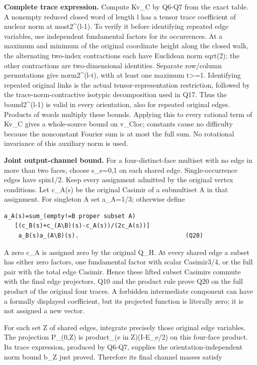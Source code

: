 \documentclass[11pt,a4paper]{article}
\newcounter{none}
\renewcommand{\[}{\begingroup\small\originaldisplaystart}
\renewcommand{\]}{\originaldisplayend\endgroup}
\begin{document}
\textbf{Complete trace expression.} Compute Kv\_C by Q6-Q7 from the
exact table. A nonempty reduced closed word of length l has a tensor
trace coefficient of nuclear norm at most2\^{}(l-1). To verify it before
identifying repeated edge variables, use independent fundamental factors
for its occurrences. At a maximum and minimum of the original coordinate
height along the closed walk, the alternating two-index contractions
each have Euclidean norm sqrt(2); the other contractions are
two-dimensional identities. Separate row/column permutations give
norm2\^{}(l-t), with at least one maximum t\textgreater=1. Identifying
repeated original links is the actual tensor-representation restriction,
followed by the trace-norm-contractive isotypic decomposition used in
Q17. Thus the bound2\^{}(l-1) is valid in every orientation, also for
repeated original edges. Products of words multiply these bounds.
Applying this to every rational term of Kv\_C gives a whole-source bound
on \textbar\textbar v\_C\textbar\textbar loc; constants cause no
difficulty because the nonconstant Fourier sum is at most the full sum.
No rotational invariance of this auxiliary norm is used.

\textbf{Joint output-channel bound.} For a four-distinct-face multiset
with no edge in more than two faces, choose s\_e=0,1 on each shared
edge. Single-occurrence edges have spin1/2. Keep every assignment
admitted by the original vertex conditions. Let c\_A(s) be the original
Casimir of a submultiset A in that assignment. For singleton A set
a\_A=1/3; otherwise define

\begin{verbatim}
a_A(s)=sum_(empty!=B proper subset A)
   [(c_B(s)+c_(A\B)(s)-c_A(s))/(2c_A(s))]
    a_B(s)a_(A\B)(s).                              (Q20)
\end{verbatim}

A zero c\_A is assigned zero by the original Q\_H. At every shared edge
a subset has either zero factors, one fundamental factor with scalar
Casimir3/4, or the full pair with the total edge Casimir. Hence these
lifted subset Casimirs commute with the final edge projectors. Q10 and
the product rule prove Q20 on the full product of the original four
traces. A forbidden intermediate component can have a formally displayed
coefficient, but its projected function is literally zero; it is not
assigned a new vector.

For each set Z of shared edges, integrate precisely those original edge
variables. The projection P\_(0,Z) is product\_(e in Z)(I-E\_e/2) on
this four-face product. Its trace expression, produced by Q6-Q7,
supplies the orientation-independent norm bound b\_Z just proved.
Therefore its final channel masses satisfy
\end{document}
